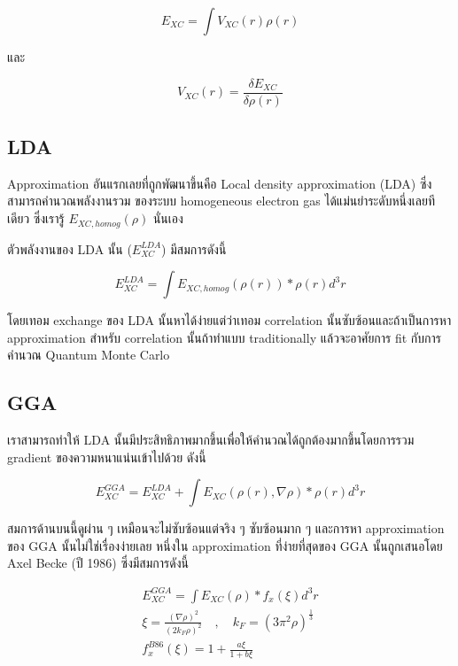 \begin{equation}
    E_{XC} = \int V_{X C}(r) \rho(r)
\end{equation}

\noindent และ

\begin{equation}
    V_{X C}(r) = \frac{\delta E_{X C}}{\delta \rho(r)}
\end{equation}

\subsection{LDA}

Approximation อันแรกเลยที่ถูกพัฒนาขึ้นคือ Local density approximation (LDA) ซึ่งสามารถคำนวณพลังงานรวม%
ของระบบ homogeneous electron gas ได้แม่นยำระดับหนึ่งเลยทีเดียว ซึ่งเรารู้ $E_{XC, homog}(\rho)$
นั่นเอง

ตัวพลังงานของ LDA นั้น ($E^{LDA}_{XC}$) มีสมการดังนี้

\begin{equation}
    E^{LDA}_{XC} = \int E_{XC,homog} (\rho(r)) * \rho(r)d^{3}r
\end{equation}

โดยเทอม exchange ของ LDA นั้นหาได้ง่ายแต่ว่าเทอม correlation นั้นซับซ้อนและถ้าเป็นการหา approximation
สำหรับ correlation นั้นถ้าทำแบบ traditionally แล้วจะอาศัยการ fit กับการคำนวณ Quantum Monte Carlo

\subsection{GGA}

เราสามารถทำให้ LDA นั้นมีประสิทธิภาพมากขึ้นเพื่อให้คำนวณได้ถูกต้องมากขึ้นโดยการรวม gradient ของความหนาแน่นเข้าไปด้วย
ดังนี้

\begin{equation}
    E^{GGA}_{XC} = E^{LDA}_{XC} + \int E_{XC} (\rho(r), \nabla\rho) * \rho(r)d^{3}r
\end{equation}

สมการด้านบนนี้ดูผ่าน ๆ เหมือนจะไม่ซับซ้อนแต่จริง ๆ ซับซ้อนมาก ๆ และการหา approximation ของ GGA
นั้นไม่ใช่เรื่องง่ายเลย หนึ่งใน approximation ที่ง่ายที่สุดของ GGA นั้นถูกเสนอโดย Axel Becke (ปี 1986)
ซึ่งมีสมการดังนี้

\begin{gather}
    E^{GGA}_{XC} = \int E_{XC} (\rho) * f_{x}(\xi) d^{3}r \\
    \xi = \frac{(\nabla \rho)^{2}}{(2 k_{F} \rho)^{2}}
    \quad , \quad k_{F} = (3\pi^{2}\rho)^{\frac{1}{3}} \\
    f^{B86}_{x}(\xi) = 1 + \frac{a\xi}{1 + b\xi}
\end{gather}

